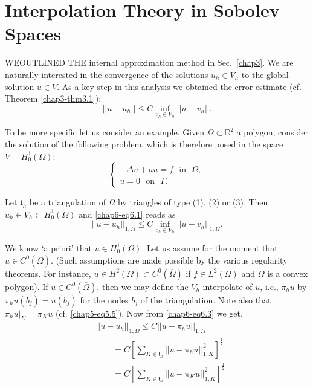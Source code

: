 
\chapter{Interpolation Theory in Sobolev Spaces}\label{chap6}

WE\pageoriginale OUTLINED THE internal approximation method in
Sec.~\ref{chap3}. We are naturally interested in the convergence of
the solutions $u_{h}\in V_{h}$ to the global solution $u\in V$. As a
key step in this analysis we obtained the error estimate (cf.\@
Theorem \ref{chap3-thm3.1}):
\begin{equation*}
||u-u_{h}||\leq C\inf_{v_{h}\in
  V_{h}}||u-v_{h}||.\tag{6.1}\label{chap6-eq6.1} 
\end{equation*}

To be more specific let us consider an example. Given $\Omega\subset
\mathbb{R}^{2}$ a polygon, consider the solution of the following
problem, which is therefore posed in the space $V=H^{1}_{0}(\Omega)$:
\begin{equation*}
\begin{cases}
-\Delta u+au=f\text{~ in~ }\Omega,\\
u=0\text{~ on~ }\Gamma.
\end{cases}\tag{6.2}\label{chap6-eq6.2}
\end{equation*}

Let $\mathfrak{t}_{h}$ be a triangulation of $\Omega$ by triangles of
type (1), (2) or (3). Then $u_{h}\in V_{h}\subset H^{1}_{0}(\Omega)$
and \eqref{chap6-eq6.1} reads as
\begin{equation*}
||u-u_{h}||_{1,\Omega}\leq C\inf\limits_{v_{h}\in
  V_{h}}||u-v_{h}||_{1,\Omega}.\tag{6.3}\label{chap6-eq6.3} 
\end{equation*}

We know `a priori' that $u\in H^{1}_{0}(\Omega)$. Let us assume for
the moment that $u\in C^{0}(\overline{\Omega})$. (Such assumptions are
made possible by the various regularity theorems. For instance, $u\in
H^{2}(\Omega)\subset C^{0}(\overline{\Omega})$ if $f\in L^{2}(\Omega)$
and $\Omega$ is a convex polygon). If $u\in C^{0}(\overline{\Omega})$,
then we may define the $V_{h}$-interpolate of $u$, i.e., $\pi_{h}u$ by
$\pi_{h}u(b_{j})=u(b_{j})$ for the nodes $b_{j}$ of the
triangulation. Note also that $\pi_{h}u|_{K}=\pi_{K}u$ (cf.\@
\eqref{chap5-eq5.5}). Now from \eqref{chap6-eq6.3} we get, 
\begin{align*}
& ||u-u_{h}||_{1,\Omega}\leq C||u-\pi_{h}u||_{1,\Omega}\\
&\qquad
  = C\left[\sum_{K\in\mathfrak{t}_{h}}||u-\pi_{h}u||^{2}_{1,K}\right]^{\frac{1}{2}}\\
&\qquad
  =C\left[\sum_{K\in\mathfrak{t}_{h}}||u-\pi_{K}u||^{2}_{1,K}\right]^{\frac{1}{2}} 
\end{align*}\pageoriginale

